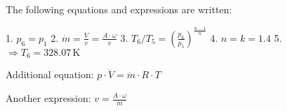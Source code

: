 The following equations and expressions are written:  

1. \( p_6 = p_1 \)  
2. \( \dot{m} = \frac{\dot{V}}{v} = \frac{A \cdot \omega}{v} \)  
3. \( T_6 / T_5 = \left( \frac{p_6}{p_5} \right)^{\frac{n-1}{n}} \)  
4. \( n = k = 1.4 \)  
5. \( \Rightarrow T_6 = 328.07 \, \text{K} \)  

Additional equation:  
\( p \cdot \dot{V} = \dot{m} \cdot R \cdot T \)  

Another expression:  
\( v = \frac{A \cdot \omega}{\dot{m}} \)
